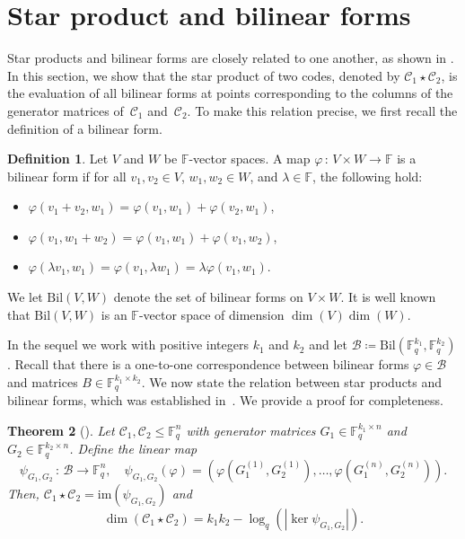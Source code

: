 \documentclass[a4paper,11pt,reqno]{article}
\newcommand{\F}{\mathbb{F}}
\newcommand{\C}{\mathcal{C}}
\newcommand{\im}{\mathrm{im}}
\newcommand{\Bil}{\mathrm{Bil}}
\theoremstyle{plain} \numberwithin{equation}{section}
\newtheorem{theorem}{Theorem}[section]
\theoremstyle{definition}
\newtheorem{definition}[theorem]{Definition}
\begin{document}
\section{Star product and bilinear forms}%
\label{sec:bil}





Star products and bilinear forms are closely related to one another, as shown in \cite{randriambololona:hal-02287120}. In this section, we show that the star product of two codes, denoted by $\C_1 \star \C_2$, is the evaluation of all bilinear forms at points corresponding to the columns of the generator matrices of~$\C_1$ and~$\C_2$. To make this relation precise, we first recall the definition of a bilinear form.

\begin{definition}
    Let $V$ and $W$ be $\F$-vector spaces. A map $\varphi \, :\,  V \times W \rightarrow \F$ is a bilinear form if for all $v_1, v_2 \in V$,  $w_1, w_2 \in W$, and $\lambda \in \F$, the following  hold:
    \begin{itemize}
        \item[1)] $\varphi(v_1 + v_2, w_1) = \varphi(v_1, w_1) + \varphi(v_2, w_1)$,
        \item[2)] $\varphi(v_1 , w_1 + w_2) = \varphi(v_1, w_1) + \varphi(v_1, w_2)$,
        \item[3)] $\varphi(\lambda v_1, w_1) = \varphi(v_1, \lambda w_1) = \lambda \varphi(v_1, w_1)$.
    \end{itemize}
We let $\Bil(V,W)$ denote the set of  bilinear forms on $V \times W$. It is well known that $\Bil(V, W)$ is an $\F$-vector space of dimension $\dim(V)\dim(W)$.
\end{definition}

In the sequel we work with positive integers $k_1$ and $k_2$ and let $\mathcal{B} \coloneqq \Bil(\F_q^{k_1},\F_q^{k_2})$. Recall that there is a one-to-one correspondence between bilinear forms $\varphi \in \mathcal{B}$ and matrices $B \in \F_q^{k_1 \times k_2}$. We now state the relation between star products and bilinear forms, which was established in~\cite{randriambololona:hal-02287120}. We provide a proof for completeness.

\begin{theorem}[\cite{randriambololona:hal-02287120}]\label{thm:starbil}
    Let $\C_1, \C_2 \leq \F_q^n$ with generator matrices $G_1 \in \F_q^{k_1 \times n}$ and $G_2 \in \F_q^{k_2 \times n}$. Define the linear map
    $$\psi_{G_1, G_2} \, : \, \mathcal{B} \rightarrow \F_q^n, \quad \psi_{G_1, G_2}(\varphi) = \left(
        \varphi\left(G_1^{(1)}, G_2^{(1)}\right),\ldots, \varphi\left(G_1^{(n)}, G_2^{(n)}\right)
    \right).$$
Then, $\C_1 \star \C_2 = \im(\psi_{G_1,G_2})$ and  $$\dim (\C_1\star\C_2) = k_1 k_2 - \log_q (|\ker \psi_{G_1,G_2}|).$$
\end{theorem}
\end{document}
